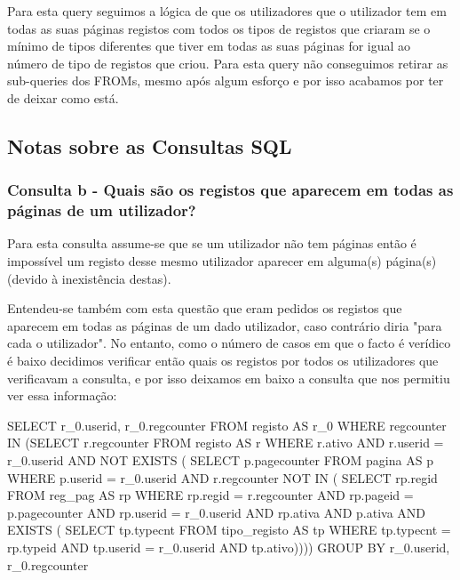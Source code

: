 \documentclass[11pt,a4paper]{article}
\begin{document}
\begin{enumerate}[label=(\alph*)]
\begin{minipage}{\textwidth}
Para esta query seguimos a lógica de que os utilizadores que o utilizador tem em todas as suas páginas registos com todos os tipos de registos que criaram se o mínimo de tipos diferentes que tiver em todas as suas páginas for igual ao número de tipo de registos que criou. Para esta query não conseguimos retirar as sub-queries dos FROMs, mesmo após algum esforço e por isso acabamos por ter de deixar como está.

\end{minipage}
\end{enumerate}

\subsection{Notas sobre as Consultas SQL}
\subsubsection{Consulta b -  Quais são os registos que aparecem em todas as páginas de um utilizador?}
Para esta consulta assume-se que se um utilizador não tem páginas então é impossível um registo desse mesmo utilizador aparecer em alguma(s) página(s) (devido à inexistência destas).

Entendeu-se também com esta questão que eram pedidos os registos que aparecem em todas as páginas de um dado utilizador, caso contrário diria "para cada o utilizador". No entanto, como o número de casos em que o facto é verídico é baixo decidimos verificar então quais os registos por todos os utilizadores que verificavam a consulta, e por isso deixamos em baixo a consulta que nos permitiu ver essa informação:

\begin{minipage}{\textwidth}
\begin{code}[language=SQL]
SELECT r_0.userid,
       r_0.regcounter
FROM registo AS r_0
WHERE regcounter IN
        (SELECT r.regcounter
         FROM registo AS r
         WHERE r.ativo
             AND r.userid = r_0.userid
             AND NOT EXISTS
                 ( SELECT p.pagecounter
                  FROM pagina AS p
                  WHERE p.userid = r_0.userid
                      AND r.regcounter NOT IN
                          ( SELECT rp.regid
                           FROM reg_pag AS rp
                           WHERE rp.regid = r.regcounter
                               AND rp.pageid = p.pagecounter
                               AND rp.userid = r_0.userid
                               AND rp.ativa
                               AND p.ativa
                               AND EXISTS
                                   ( SELECT tp.typecnt
                                    FROM tipo_registo AS tp
                                    WHERE tp.typecnt = rp.typeid
                                        AND tp.userid = r_0.userid
                                        AND tp.ativo))))
GROUP BY r_0.userid,
         r_0.regcounter
         
\end{code}

\end{minipage}
\end{document}
